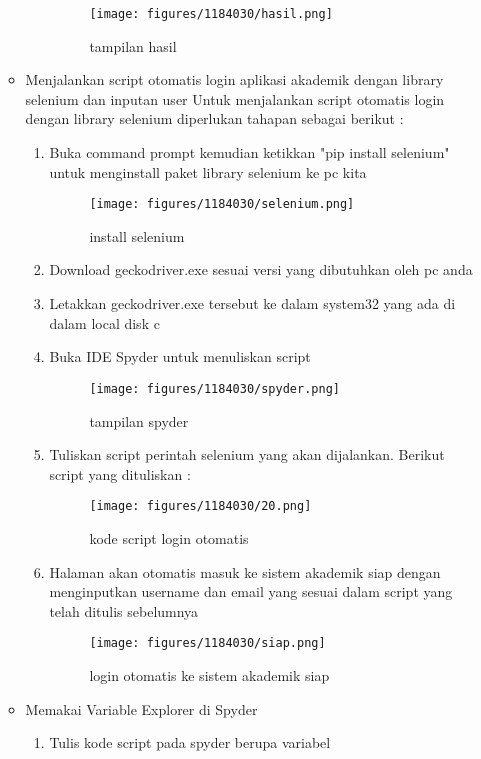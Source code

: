 \begin{enumerate}
\begin{itemize}
\begin{enumerate}
	 		\begin{figure}[H]
			\texttt{[image: figures/1184030/hasil.png]}
			\centering
			\caption{tampilan hasil}
			\end{figure}
	 \end{enumerate}
	\item Menjalankan script otomatis login aplikasi akademik dengan library selenium dan inputan user
		Untuk menjalankan script otomatis login dengan library selenium diperlukan tahapan sebagai berikut :
		\begin{enumerate}
		\item Buka command prompt kemudian ketikkan "pip install selenium" untuk menginstall paket library selenium ke pc kita
			\begin{figure}[H]
			\texttt{[image: figures/1184030/selenium.png]}
			\centering
			\caption{install selenium}
			\end{figure}
		\item Download geckodriver.exe sesuai versi yang dibutuhkan oleh pc anda
		\item Letakkan geckodriver.exe tersebut ke dalam system32 yang ada di dalam local disk c
		\item Buka IDE Spyder untuk menuliskan script
			\begin{figure}[H]
			\texttt{[image: figures/1184030/spyder.png]}
			\centering
			\caption{tampilan spyder}
			\end{figure}
		\item Tuliskan script perintah selenium yang akan dijalankan. Berikut script yang dituliskan :
			\begin{figure}[H]
			\texttt{[image: figures/1184030/20.png]}
			\centering
			\caption{kode script login otomatis}
			\end{figure}
		\item Halaman akan otomatis masuk ke sistem akademik siap dengan menginputkan username dan email yang sesuai dalam script yang telah ditulis sebelumnya
			\begin{figure}[H]
			\texttt{[image: figures/1184030/siap.png]}
			\centering
			\caption{login otomatis ke sistem akademik siap}
			\end{figure}
		\end{enumerate}
		\item Memakai Variable Explorer di Spyder
		\begin{enumerate}
		\item Tulis kode script pada spyder berupa variabel

\end{enumerate}
\end{itemize}
\end{enumerate}
